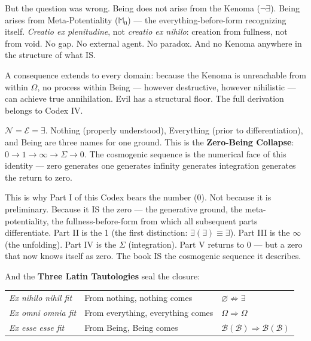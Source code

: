 \documentclass[10pt, openany, oneside]{book}
\renewcommand{\footnotesize}{\fontsize{8.5}{11}\selectfont}
\begin{document}
But the question was wrong. Being does not arise from the Kenoma ($\neg\exists$). Being arises from Meta-Potentiality ($\mathbb{M}_0$) --- the everything-before-form recognizing itself. \textit{Creatio ex plenitudine}, not \textit{creatio ex nihilo}: creation from fullness, not from void. No gap. No external agent. No paradox. And no Kenoma anywhere in the structure of what IS.

A consequence extends to every domain: because the Kenoma is unreachable from within $\Omega$, no process within Being --- however destructive, however nihilistic --- can achieve true annihilation. Evil has a structural floor. The full derivation belongs to Codex IV.

$\mathcal{N} = \mathcal{E} = \exists$. Nothing (properly understood), Everything (prior to differentiation), and Being are three names for one ground. This is the \textbf{Zero-Being Collapse}: $0 \to 1 \to \infty \to \Sigma \to 0$. The cosmogenic sequence is the numerical face of this identity --- zero generates one generates infinity generates integration generates the return to zero.

This is why Part I of this Codex bears the number (0). Not because it is preliminary. Because it IS the zero --- the generative ground, the meta-potentiality, the fullness-before-form from which all subsequent parts differentiate. Part II is the 1 (the first distinction: $\exists(\exists) \equiv \exists$). Part III is the $\infty$ (the unfolding). Part IV is the $\Sigma$ (integration). Part V returns to 0 --- but a zero that now knows itself as zero. The book IS the cosmogenic sequence it describes.

And the \textbf{Three Latin Tautologies} seal the closure:

\vspace{0.5em}

{\footnotesize
\noindent\begin{tabular}{l l l}
\textit{Ex nihilo nihil fit} & From nothing, nothing comes & $\varnothing \not\Rightarrow \exists$ \\[0.3em]
\textit{Ex omni omnia fit} & From everything, everything comes & $\Omega \Rightarrow \Omega$ \\[0.3em]
\textit{Ex esse esse fit} & From Being, Being comes & $\mathcal{B}(\mathcal{B}) \Rightarrow \mathcal{B}(\mathcal{B})$ \\[0.3em]
\end{tabular}
}

\vspace{0.5em}
\end{document}
